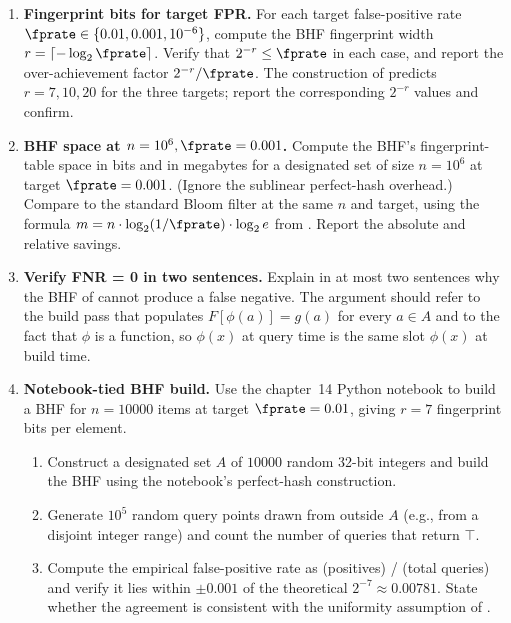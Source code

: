 \begin{enumerate}


\item \exstar
\label{ex:ch14-1}
\textbf{Fingerprint bits for target FPR.}
For each target false-positive rate $\fprate \in \{0.01, 0.001,
10^{-6}\}$, compute the BHF fingerprint width
$r = \lceil -\log_2 \fprate \rceil$. Verify that $2^{-r} \le
\fprate$ in each case, and report the over-achievement factor
$2^{-r} / \fprate$. The construction of 
predicts $r = 7, 10, 20$ for the three targets; report the
corresponding $2^{-r}$ values and confirm.

\item \exstar
\label{ex:ch14-2}
\textbf{BHF space at $n = 10^6, \fprate = 0.001$.}
Compute the BHF's fingerprint-table space in bits and in megabytes
for a designated set of size $n = 10^6$ at target $\fprate =
0.001$. (Ignore the sublinear perfect-hash overhead.) Compare to
the standard Bloom filter at the same $n$ and target, using the
formula $m = n \cdot \log_2(1/\fprate) \cdot \log_2 e$ from
. Report the absolute and relative
savings.

\item \exstar
\label{ex:ch14-3}
\textbf{Verify FNR = 0 in two sentences.}
Explain in at most two sentences why the BHF of 
cannot produce a false negative. The argument should refer to the
build pass that populates $F[\phi(a)] = g(a)$ for every $a \in A$
and to the fact that $\phi$ is a function, so $\phi(x)$ at query
time is the same slot $\phi(x)$ at build time.


\item \exstarstar
\label{ex:ch14-4}
\textbf{Notebook-tied BHF build.}
Use the chapter~14 Python notebook to build a BHF for $n = 10000$
items at target $\fprate = 0.01$, giving $r = 7$ fingerprint bits
per element.
\begin{enumerate}
  \item[(a)] Construct a designated set $A$ of $10000$ random
    32-bit integers and build the BHF using the notebook's
    perfect-hash construction.
  \item[(b)] Generate $10^5$ random query points drawn from outside
    $A$ (e.g., from a disjoint integer range) and count the number
    of queries that return $\top$.
  \item[(c)] Compute the empirical false-positive rate as
    (positives) / (total queries) and verify it lies within
    $\pm 0.001$ of the theoretical $2^{-7} \approx 0.00781$. State
    whether the agreement is consistent with the uniformity
    assumption of .
\end{enumerate}


\end{enumerate}
